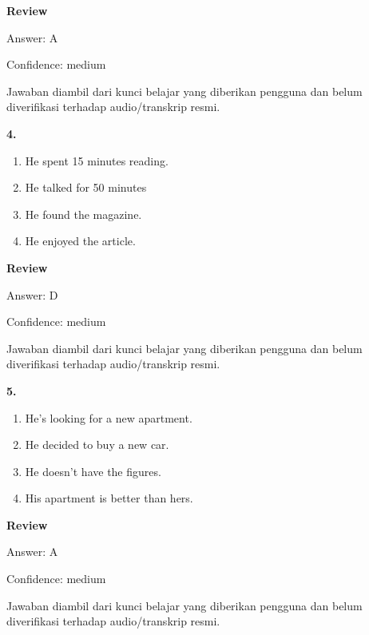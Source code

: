 \documentclass[12pt]{article}
\begin{document}
\par
\begingroup
\setlength{\parskip}{0pt}
\setlength{\parindent}{0pt}
\textbf{Review}\par
Answer: A\par
Confidence: medium\par
Jawaban diambil dari kunci belajar yang diberikan pengguna dan belum diverifikasi terhadap audio/transkrip resmi.\par
\endgroup
\par
\vspace{0.25\baselineskip}
\noindent\textbf{4.}
\begin{enumerate}[label=(\Alph*),leftmargin=*,itemsep=0.2em]
\item He spent 15 minutes reading.
\item He talked for 50 minutes
\item He found the magazine.
\item He enjoyed the article.
\end{enumerate}
\par
\begingroup
\setlength{\parskip}{0pt}
\setlength{\parindent}{0pt}
\textbf{Review}\par
Answer: D\par
Confidence: medium\par
Jawaban diambil dari kunci belajar yang diberikan pengguna dan belum diverifikasi terhadap audio/transkrip resmi.\par
\endgroup
\par
\vspace{0.25\baselineskip}
\noindent\textbf{5.}
\begin{enumerate}[label=(\Alph*),leftmargin=*,itemsep=0.2em]
\item He's looking for a new apartment.
\item He decided to buy a new car.
\item He doesn't have the figures.
\item His apartment is better than hers.
\end{enumerate}
\par
\begingroup
\setlength{\parskip}{0pt}
\setlength{\parindent}{0pt}
\textbf{Review}\par
Answer: A\par
Confidence: medium\par
Jawaban diambil dari kunci belajar yang diberikan pengguna dan belum diverifikasi terhadap audio/transkrip resmi.\par
\endgroup
\par
\vspace{0.25\baselineskip}
\end{document}
